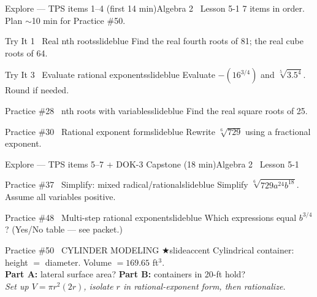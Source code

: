 \documentclass[aspectratio=169, 11pt]{beamer}
\begin{document}
\begin{frame}[shrink=12]{Explore --- TPS items 1--4 (first 14 min)}{Algebra 2 \textperiodcentered\ Lesson 5-1}
{\small\textcolor{slidegray}{7 items in order. Plan \(\sim\)10 min for Practice \#50.}}

\vspace{0.1cm}
\begin{projcard}{Try It 1 \textperiodcentered\ Real nth roots}{slideblue}
\small Find the real fourth roots of 81; the real cube roots of 64.
\end{projcard}
\vspace{-0.15cm}
\begin{projcard}{Try It 3 \textperiodcentered\ Evaluate rational exponents}{slideblue}
\small Evaluate \(-(16^{3/4})\) and \(\sqrt[5]{3.5^4}\). Round if needed.
\end{projcard}
\vspace{-0.15cm}
\begin{projcard}{Practice \#28 \textperiodcentered\ nth roots with variables}{slideblue}
\small Find the real square roots of 25.
\end{projcard}
\vspace{-0.15cm}
\begin{projcard}{Practice \#30 \textperiodcentered\ Rational exponent form}{slideblue}
\small Rewrite \(\sqrt[6]{729}\) using a fractional exponent.
\end{projcard}
\end{frame}

\begin{frame}[shrink=8]{Explore --- TPS items 5--7 + DOK-3 Capstone (18 min)}{Algebra 2 \textperiodcentered\ Lesson 5-1}
\vspace{0.1cm}
\begin{projcard}{Practice \#37 \textperiodcentered\ Simplify: mixed radical/rational}{slideblue}
\small Simplify \(\sqrt[6]{729a^{24}b^{18}}\). Assume all variables positive.
\end{projcard}
\vspace{-0.15cm}
\begin{projcard}{Practice \#48 \textperiodcentered\ Multi-step rational exponent}{slideblue}
\small Which expressions equal \(b^{3/4}\)? (Yes/No table --- see packet.)
\end{projcard}
\vspace{-0.15cm}
\begin{projcard}{Practice \#50 \textperiodcentered\ CYLINDER MODELING \(\bigstar\)}{slideaccent}
\small Cylindrical container: height \(=\) diameter. Volume \(= 169.65\) ft\(^3\).\\
\textbf{Part A:} lateral surface area? \quad \textbf{Part B:} containers in 20-ft hold?\\
\textit{Set up \(V = \pi r^2(2r)\), isolate \(r\) in rational-exponent form, then rationalize.}
\end{projcard}
\end{frame}
\end{document}
